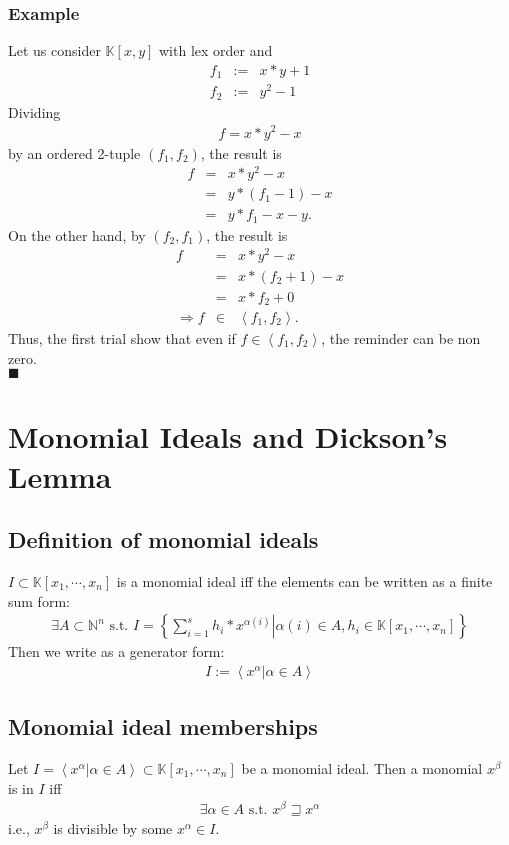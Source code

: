 \documentclass[11pt]{book}
\begin{document}
\subsubsection{Example}
Let us consider $\mathbb{K}[x,y]$ with lex order and
\begin{eqnarray}
f_1 &:=& x*y + 1\\
f_2 &:=& y^2 -1
\end{eqnarray}
Dividing
\begin{eqnarray}
f = x*y^2 -x
\end{eqnarray}
by an ordered 2-tuple $(f_1, f_2)$, the result is
\begin{eqnarray}
f &=& x*y^2 -x \\
&=& y*(f_1 -1) -x \\
&=& y*f_1 -x-y.
\end{eqnarray}
On the other hand, by $(f_2, f_1)$, the result is
\begin{eqnarray}
f &=& x*y^2 -x \\
&=& x*(f_2 + 1) -x \\
&=& x*f_2 + 0\\
\Rightarrow f &\in& \left< f_1, f_2\right>.
\end{eqnarray}
Thus, the first trial show that even if $f \in \left< f_1, f_2\right>$, the reminder can be non zero.\\
$\blacksquare$

\section{Monomial Ideals and Dickson's Lemma}
\subsection{Definition of monomial ideals}
$I \subset \mathbb{K}[x_1, \cdots, x_n]$ is a monomial ideal iff the elements can be written as a finite sum form:
\begin{eqnarray}
\exists A \subset \mathbb{N}^n \text{ s.t. } I = \left\{\left. \sum_{i=1}^s h_i * x^{\alpha(i)} \right| \alpha(i) \in A, h_i \in \mathbb{K}[x_1, \cdots, x_n] \right\}
\end{eqnarray}
Then we write as a generator form:
\begin{eqnarray}
I := \left<\left. x^\alpha \right| \alpha \in A\right>
\end{eqnarray}

\subsection{Monomial ideal memberships}
\label{Lemma2OfSection2_3}
Let $I = \left<\left. x^\alpha \right| \alpha \in A\right> \subset \mathbb{K}[x_1, \cdots, x_n]$ be a monomial ideal.
Then a monomial $x^\beta$ is in $I$ iff 
\begin{eqnarray}
\exists \alpha \in A \text{ s.t. } x^\beta \sqsupseteq x^\alpha
\end{eqnarray}
i.e., $x^\beta$ is divisible by some $x^\alpha \in I$.
\end{document}
